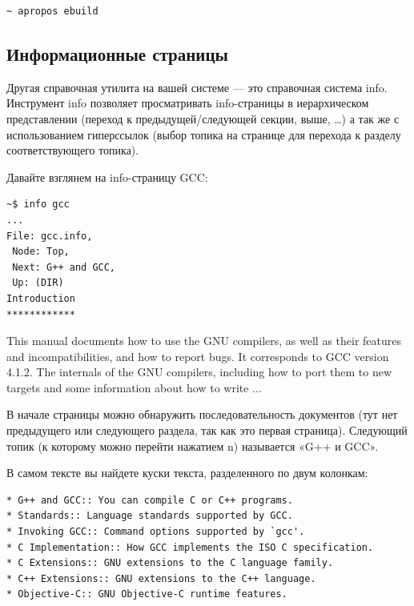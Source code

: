 \documentclass[10pt]{book}
\begin{document}
\vspace{3mm}
\begin{tcolorbox}
\begin{lstlisting}
~ apropos ebuild 
\end{lstlisting}
\end{tcolorbox}

\subsection{Информационные страницы}

Другая справочная утилита на вашей системе — это справочная система info. Инструмент info позволяет просматривать info-страницы в иерархическом представлении (переход к предыдущей/следующей секции, выше, …) а так же с использованием гиперссылок (выбор топика на странице для перехода к разделу соответствующего топика).

Давайте взглянем на info-страницу GCC:

\vspace{3mm}
\begin{tcolorbox}
\begin{lstlisting}
~$ info gcc
...
File: gcc.info,
 Node: Top,
 Next: G++ and GCC,
 Up: (DIR)
Introduction
************
\end{lstlisting}
This manual documents how to use the GNU compilers, as well as their
features and incompatibilities, and how to report bugs. It corresponds
to GCC version 4.1.2. The internals of the GNU compilers, including
how to port them to new targets and some information about how to write
...

\end{tcolorbox}

В начале страницы можно обнаружить последовательность документов (тут нет предыдущего или следующего раздела, так как это первая страница). Следующий топик (к которому можно перейти нажатием n) называется «G++ и GCC».

В самом тексте вы найдете куски текста, разделенного по двум колонкам:

\vspace{3mm}
\begin{tcolorbox}
\begin{lstlisting}
* G++ and GCC:: You can compile C or C++ programs.
* Standards:: Language standards supported by GCC.
* Invoking GCC:: Command options supported by `gcc'.
* C Implementation:: How GCC implements the ISO C specification.
* C Extensions:: GNU extensions to the C language family.
* C++ Extensions:: GNU extensions to the C++ language.
* Objective-C:: GNU Objective-C runtime features.
\end{lstlisting}
\end{tcolorbox}
\end{document}
